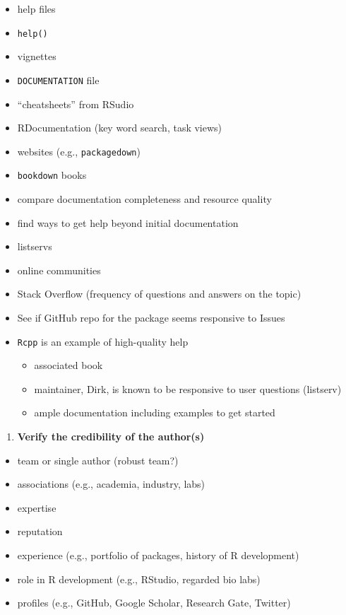 \documentclass[10pt,letterpaper]{article}
\providecommand{\tightlist}{%
  \setlength{\itemsep}{0pt}\setlength{\parskip}{0pt}}
\begin{document}
\begin{itemize}
\tightlist
\item
  help files
\item
  \texttt{help()}
\item
  vignettes
\item
  \texttt{DOCUMENTATION} file
\item
  ``cheatsheets'' from RSudio
\item
  RDocumentation (key word search, task views)
\item
  websites (e.g., \texttt{packagedown})
\item
  \texttt{bookdown} books
\item
  compare documentation completeness and resource quality
\item
  find ways to get help beyond initial documentation
\item
  listservs
\item
  online communities
\item
  Stack Overflow (frequency of questions and answers on the topic)
\item
  See if GitHub repo for the package seems responsive to Issues
\item
  \texttt{Rcpp} is an example of high-quality help

  \begin{itemize}
  \tightlist
  \item
    associated book
  \item
    maintainer, Dirk, is known to be responsive to user questions
    (listserv)
  \item
    ample documentation including examples to get started
  \end{itemize}
\end{itemize}

\begin{enumerate}
\def\labelenumi{\arabic{enumi}.}
\setcounter{enumi}{4}
\tightlist
\item
  \textbf{Verify the credibility of the author(s)}
\end{enumerate}

\begin{itemize}
\tightlist
\item
  team or single author (robust team?)
\item
  associations (e.g., academia, industry, labs)
\item
  expertise
\item
  reputation
\item
  experience (e.g., portfolio of packages, history of R development)
\item
  role in R development (e.g., RStudio, regarded bio labs)
\item
  profiles (e.g., GitHub, Google Scholar, Research Gate, Twitter)
\end{itemize}
\end{document}
